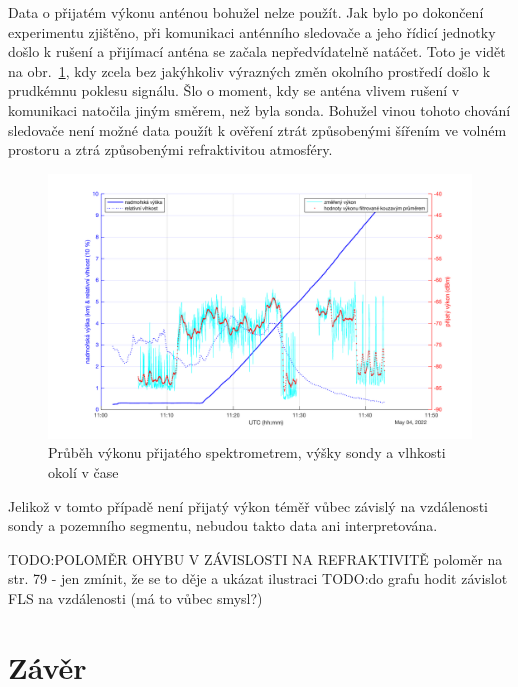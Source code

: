 \documentclass[twoside]{ctuthesis}
\theoremstyle{plain}
\theoremstyle{definition}
\theoremstyle{note}
\begin{document}
	Data o přijatém výkonu anténou bohužel nelze použít. Jak bylo po dokončení experimentu zjištěno, při komunikaci anténního sledovače a jeho řídicí jednotky došlo k rušení a přijímací anténa se začala nepředvídatelně natáčet. Toto je vidět na obr.~\ref{grah:p:alt:hum}, kdy zcela bez jakýhkoliv výrazných změn okolního prostředí došlo k prudkémnu poklesu signálu. Šlo o moment, kdy se anténa vlivem rušení v komunikaci natočila jiným směrem, než byla sonda. Bohužel vinou tohoto chování sledovače není možné data použít k ověření ztrát způsobenými šířením ve volném prostoru a ztrá způsobenými refraktivitou atmosféry. 

	\begin{figure}[hbtp]
		\centering
		\includegraphics[width=.9\textwidth]{Graphs/alt_hum_p_p_filt.pdf}
		\caption{Průběh výkonu přijatého spektrometrem, výšky sondy a vlhkosti okolí v čase}
		\label{grah:p:alt:hum}
	\end{figure}

	Jelikož v tomto případě není přijatý výkon téměř vůbec závislý na vzdálenosti sondy a pozemního segmentu, nebudou takto data ani interpretována. 

	TODO:POLOMĚR OHYBU V ZÁVISLOSTI NA REFRAKTIVITĚ poloměr na str. 79 - jen zmínit, že se to děje a ukázat ilustraci
	TODO:do grafu hodit závislot FLS na vzdálenosti (má to vůbec smysl?)

















	


\chapter{Závěr}
\end{document}
